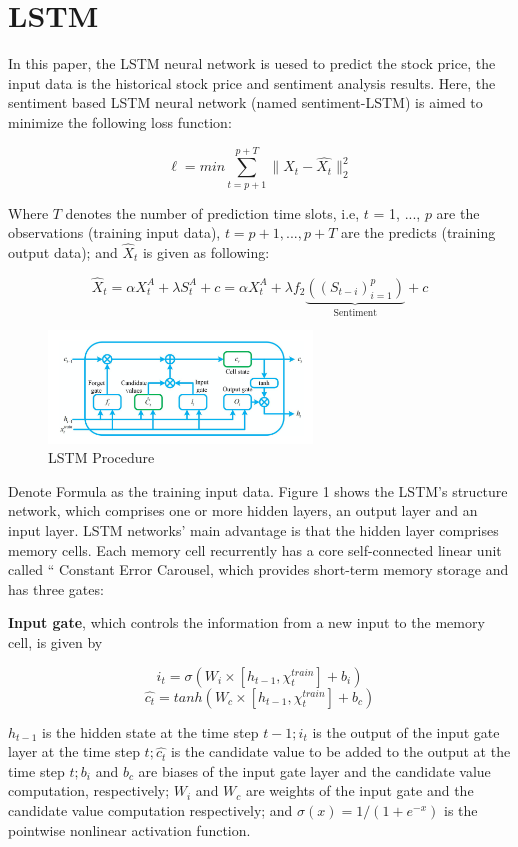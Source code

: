 \documentclass{article}
\begin{document}
\section{LSTM}

In this paper, the LSTM neural network is uesed to predict the stock price, the input data is the historical stock price and sentiment analysis results. Here, the sentiment based LSTM neural network (named sentiment-LSTM) is aimed to minimize the following loss function:

$$ \ell = min \sum_{t=p+1}^{p+T} \bigg\| X_{t} - \hat{X_{t}} \bigg\|_{2}^{2} $$

Where $T$ denotes the number of prediction time slots, i.e, $t$ = 1, ..., $p$ are the observations (training input data), $t = p+1, ..., p+T$ are the predicts (training output data); and $\hat{X}_{t}$ is given as following:

$$\hat{X}_t = \alpha X_{t}^{A} + \lambda S_{t}^{A} + c = \alpha X_{t}^{A} + \lambda f_{2}\underbrace{((S_{t-i})_{i=1}^{p})}_\text{Sentiment}+c$$

\begin{figure}[htp]
    \centering
    \includegraphics[width=7cm]{LSTM.png}
    \caption{LSTM Procedure}
    \label{fig:LSTM}
\end{figure}

Denote Formula as the training input data. Figure 1 shows the LSTM's structure network, which comprises one or more hidden layers, an output layer and an input layer. LSTM networks’ main advantage is that the hidden layer comprises memory cells. Each memory cell recurrently has a core self-connected linear unit called “ Constant Error Carousel, which provides short-term memory storage and has three gates:

\textbf{Input gate}, which controls the information from a new input to the memory cell, is given by

$$i_{t} = \sigma (W_{i} \times [h_{t-1}, \chi_{t}^{train}] + b_{i})$$
$$\hat{c_{t}} = tanh(W_{c} \times [h_{t-1}, \chi_{t}^{train}] + b_{c} )$$

$h_{t-1}$ is the hidden state at the time step $t-1;i_{t}$ is the output of the input gate layer at the time step $t; \hat{c_{t}} $ is the candidate value to be added to the output at the time step $t; b_{i}$ and $b_{c}$ are biases of the input gate layer and the candidate value computation, respectively; $W_{i}$ and $W_{c}$ are weights of the input gate and the candidate value computation respectively; and $\sigma (x) = 1/(1+e^{-x})$ is the pointwise nonlinear activation function.
\end{document}
